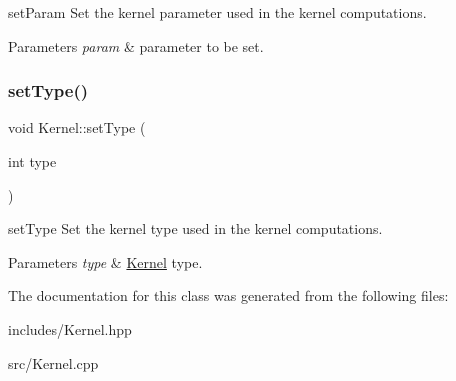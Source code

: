 set\+Param Set the kernel parameter used in the kernel computations. 


\begin{DoxyParams}{Parameters}
{\em param} & parameter to be set. \\
\hline
\end{DoxyParams}
\mbox{\label{class_kernel_ad01e209470accf44ea240078f39fb127}} 
\subsubsection{\texorpdfstring{set\+Type()}{setType()}}
{\footnotesize\ttfamily void Kernel\+::set\+Type (\begin{DoxyParamCaption}\item[{int}]{type }\end{DoxyParamCaption})}



set\+Type Set the kernel type used in the kernel computations. 


\begin{DoxyParams}{Parameters}
{\em type} & \hyperlink{class_kernel}{Kernel} type. \\
\hline
\end{DoxyParams}


The documentation for this class was generated from the following files\+:\begin{DoxyCompactItemize}
\item 
includes/Kernel.\+hpp\item 
src/Kernel.\+cpp\end{DoxyCompactItemize}
